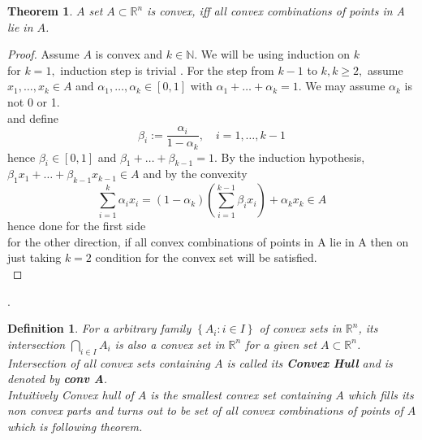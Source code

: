 \documentclass[oneside]{book}
\newtheorem{theorem}{Theorem}[section]
\newtheorem{mydef}{Definition}
\begin{document}
\begin{theorem}
$A$ set $A \subset \mathbb{R}^{n}$ is convex, iff  all convex combinations of points in A lie
in $A$.
\end{theorem}

\begin{proof}

 Assume $A$ is convex and $k \in \mathbb{N} .$ We will be using induction on $k$ \\ for $k=1,$ induction step is trivial  . For the step from $k-1$ to $k, k \geq 2,$ assume $x_{1}, \ldots, x_{k} \in A$ and $\alpha_{1}, \ldots, \alpha_{k} \in[0,1]$ with $\alpha_{1}+\ldots+\alpha_{k}=1 .$ We may assume $\alpha_{k}$ is not 0 or 1.\\ and define 
$$
\beta_{i}:=\frac{\alpha_{i}}{1-\alpha_{k}}, \quad i=1, \ldots, k-1
$$
hence $\beta_{i} \in[0,1]$ and $\beta_{1}+\ldots+\beta_{k-1}=1 .$ By the induction hypothesis, $\beta_{1} x_{1}+\ldots+\beta_{k-1} x_{k-1} \in A$
and by the convexity
$$
\sum_{i=1}^{k} \alpha_{i} x_{i}=\left(1-\alpha_{k}\right)\left(\sum_{i=1}^{k-1} \beta_{i} x_{i}\right)+\alpha_{k} x_{k} \in A
$$
hence done for the first side\\
for the other direction, if all convex combinations of points in A lie in A then on just taking $k =2$ condition for the convex set will be satisfied.\\

\end{proof}.

\begin{mydef} 


For a arbitrary family  $\left\{A_{i}: i \in I\right\}$ of convex sets in   $\mathbb{R}^{n}$, its intersection $\bigcap_{i \in I} A_{i}$ is also a convex set in $\mathbb{R}^{n}$  for a given set $A \subset \mathbb{R}^{n}$.\\ Intersection of all convex sets containing $A$ is called its  \textbf{Convex Hull} and is denoted by  \textbf{conv A}.\\
 Intuitively Convex hull of $A$  is the smallest convex set containing $A$ which fills its non convex parts and turns out to be set of all convex combinations of points of $A$ which is following theorem.
 
 \end{mydef}
 
\end{document}
